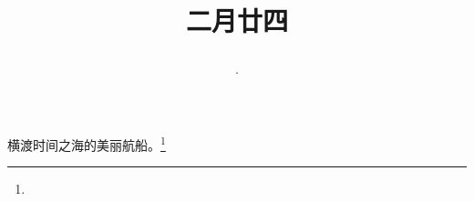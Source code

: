 \title{\date[d=2,m=4,y=2024][year:cn-y,年,month:cn,day:cn,日,·,weekday]·二月廿四 }
横渡时间之海的美丽航船。\footnote{ }

